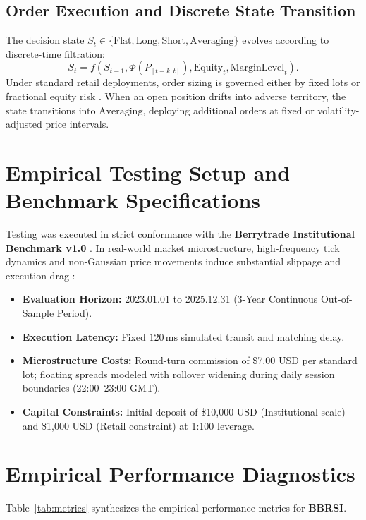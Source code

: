 \documentclass[11pt,a4paper]{article}
\begin{document}
\subsection{Order Execution and Discrete State Transition}
The decision state $S_t \in \{\text{Flat}, \text{Long}, \text{Short}, \text{Averaging}\}$ evolves according to discrete-time filtration:
\begin{equation}
S_{t} = f(S_{t-1}, \Phi(P_{[t-k, t]}), \text{Equity}_t, \text{MarginLevel}_t).
\end{equation}
Under standard retail deployments, order sizing is governed either by fixed lots or fractional equity risk \cite{lopez2018advances, carhart1997persistence}. When an open position drifts into adverse territory, the state transitions into $\text{Averaging}$, deploying additional orders at fixed or volatility-adjusted price intervals.

\section{Empirical Testing Setup and Benchmark Specifications}
Testing was executed in strict conformance with the \textbf{Berrytrade Institutional Benchmark v1.0} \cite{artsu2026illusion}. In real-world market microstructure, high-frequency tick dynamics and non-Gaussian price movements induce substantial slippage and execution drag \cite{kyle1985continuous, amihud2002illiquidity, cont2001empirical, mandelbrot1963variation}:
\begin{itemize}
    \item \textbf{Evaluation Horizon:} 2023.01.01 to 2025.12.31 (3-Year Continuous Out-of-Sample Period).
    \item \textbf{Execution Latency:} Fixed $120\,\text{ms}$ simulated transit and matching delay.
    \item \textbf{Microstructure Costs:} Round-turn commission of \$7.00 USD per standard lot; floating spreads modeled with rollover widening during daily session boundaries (22:00--23:00 GMT).
    \item \textbf{Capital Constraints:} Initial deposit of \$10,000 USD (Institutional scale) and \$1,000 USD (Retail constraint) at 1:100 leverage.
\end{itemize}

\section{Empirical Performance Diagnostics}
Table~\ref{tab:metrics} synthesizes the empirical performance metrics for \textbf{BBRSI}.
\end{document}
